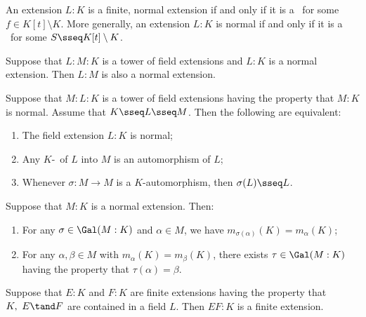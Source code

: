 \documentclass{article}
\begin{document}
  \begin{tproposition}
    An extension \( L:K \) is a finite, normal extension if and only if it is a \sfe~for some \( f\in K[t]\setminus K \). More generally, an extension \( L:K \) is normal if and only if it is a \sfe~for some \( S\sseq K[t]\setminus K \).
  \end{tproposition}

  \begin{tproposition}
    Suppose that \( L:M:K \) is a tower of field extensions and \( L:K \) is a normal extension. Then \( L:M \) is also a normal extension.
  \end{tproposition}

  \begin{ttheorem}
    Suppose that \( M:L:K \) is a tower of field extensions having the property that \( M:K \) is normal. Assume that \( K\sseq L\sseq M \). Then the following are equivalent:
    \begin{enumerate}[label=(\roman*)]
      \item The field extension \( L:K \) is normal;
      \item Any \( K \)-\homo~of \( L \) into \( M \) is an automorphism of \( L \);
      \item Whenever \( \sigma:M\to M \) is a \( K \)-automorphism, then \( \sigma(L)\sseq L \).
    \end{enumerate}
  \end{ttheorem}

  \begin{tproposition}
    Suppose that \( M:K \) is a normal extension. Then:
    \begin{enumerate}[label=(\alph*)]
      \item For any \( \sigma\in\Gal(M:K) \) and \( \alpha\in M \), we have \( m_{\sigma(\alpha)}(K)=m_\alpha(K) \);
      \item For any \( \alpha,\beta\in M \) with \( m_\alpha(K)=m_\beta(K) \), there exists \( \tau\in\Gal(M:K) \) having the property that \( \tau(\alpha)=\beta \).
    \end{enumerate}
  \end{tproposition}

  \begin{tproposition}
    Suppose that \( E:K \) and \( F:K \) are finite extensions having the property that \( K,\ E\tand F \) are contained in a field \( L \). Then \( EF:K \) is a finite extension.
  \end{tproposition}
\end{document}
